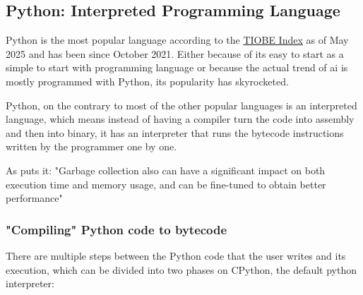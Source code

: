 \subsection{Python: Interpreted Programming Language}
Python is the most popular language according to the \href{https://www.tiobe.com/tiobe-index/}{TIOBE Index} as of May 2025 and has been since October 2021. Either because of its easy to start as a simple to start with programming language or because the actual trend of \gls{ai} is mostly programmed with Python, its popularity has skyrocketed.

Python, on the contrary to most of the other popular languages is an interpreted language, which means instead of having a compiler turn the code into assembly and then into binary, it has an interpreter that runs the \gls{bytecode} instructions written by the programmer one by one.

As \cite{10.1145/1103845.1094836} puts it: "Garbage collection also can have a significant impact on both execution time and memory usage, and can be fine-tuned to obtain better performance"

\subsubsection{"Compiling" Python code to \gls{bytecode}}
There are multiple steps between the Python code that the user writes and its execution, which can be divided into two phases \cite{cpython-docs} on \gls{CPython}, the default python interpreter:





